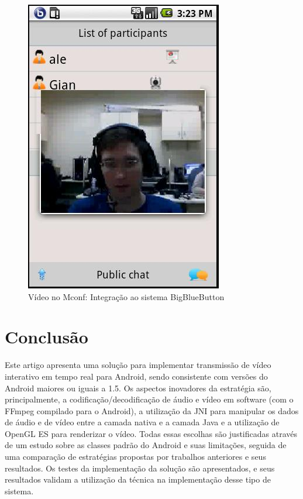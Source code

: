 \documentclass{acm_proc_article-sp}
\begin{document}
\begin{figure}[htp]
 \centering
 \includegraphics[scale=0.38]{./mconf.jpg}
\caption{Vídeo no Mconf: Integração ao sistema BigBlueButton}\label{figura_mconf}
\end{figure}

\section{Conclusão}

Este artigo apresenta uma solução para implementar transmissão de vídeo interativo em tempo real para Android, sendo consistente com versões do Android maiores ou iguais a 1.5. Os aspectos inovadores da estratégia são, principalmente, a codificação/decodificação de áudio e vídeo em software (com o FFmpeg compilado para o Android), a utilização da JNI para manipular os dados de áudio e de vídeo entre a camada nativa e a camada Java e a utilização de OpenGL ES para renderizar o vídeo. Todas essas escolhas são justificadas através de um estudo sobre as classes padrão do Android e suas limitações, seguida de uma comparação de estratégias propostas por trabalhos anteriores e seus resultados. Os testes da implementação da solução são apresentados, e seus resultados validam a utilização da técnica na implementação desse tipo de sistema.
\end{document}
